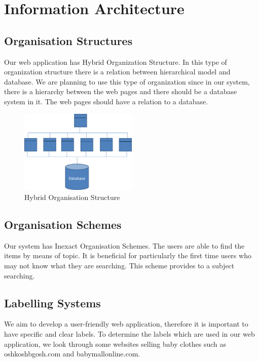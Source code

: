 \section{Information Architecture}

\subsection{Organisation Structures}
Our web application has Hybrid Organization Structure. In this type of organization structure there is a relation between hierarchical model and database. We are planning to use this type of organization since in our system, there is a hierarchy between the web pages and there should be a database system in it. The web pages should have a relation to a database. 

\begin{figure}[h!]
  \centering  
  \includegraphics[width=0.5\textwidth]{Images/hybrid_org.png}                
  \caption{Hybrid Organisation Structure}
  \label{fig:hybrid_org}
\end{figure}


\subsection{Organisation Schemes}
Our system has Inexact Organisation Schemes. The users are able to find the items by means of topic. It is beneficial for particularly the first time users who may not know what they are searching. This scheme provides to a subject searching. 

\subsection{Labelling Systems}
We aim to develop a user-friendly web application, therefore it is important to have specific and clear labels. To determine the labels which are used in our web application, we look through some websites selling baby clothes such as oshkoshbgosh.com and babymallonline.com.

